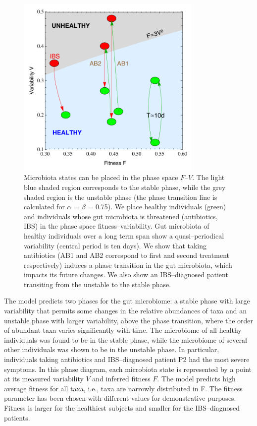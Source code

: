 \begin{figure}
	\centering
	\vspace*{-5mm} %
	\includegraphics[width=0.8\textwidth]{results/finalPlot33_new.pdf}
	\caption{Microbiota states can be placed in the phase space $F$--$V$. The light blue shaded region corresponds to the stable phase, while the grey shaded region is the unstable phase (the phase transition line is calculated for  $\alpha$ = $\beta$ = 0.75). We place healthy individuals (green) and individuals whose gut microbiota is threatened (antibiotics, IBS) in the phase space fitness--variability. Gut microbiota of healthy individuals over a long term span show a quasi--periodical variability (central period is ten days). We show that taking antibiotics (AB1 and AB2 correspond to first and second treatment respectively) induces a phase transition in the gut microbiota, which impacts its future changes. We also show an IBS--diagnosed patient transiting from the unstable to the stable phase.}
	\label{fig:main3}
\end{figure}

The model predicts two phases for the gut microbiome: a stable phase with large variability that permits some changes in the relative abundances of taxa and an unstable phase with larger variability, above the phase transition, where the order of abundant taxa varies significantly with time. The microbiome of all healthy individuals was found to be in the stable phase, while the microbiome of several other individuals was shown to be in the unstable phase. In particular, individuals taking antibiotics and IBS--diagnosed patient P2 had the most severe symptoms. In this phase diagram, each microbiota state is represented by a point at its measured variability $V$ and inferred fitness $F$. The model predicts high average fitness for all taxa, i.e., taxa are narrowly distributed in F. The fitness parameter has been chosen with different values for demonstrative purposes. Fitness is larger for the healthiest subjects and smaller for the IBS--diagnosed patients.

